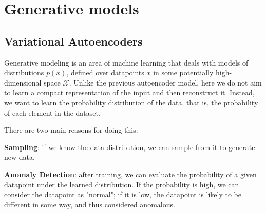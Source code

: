 \chapter{Generative models}

\section{Variational Autoencoders}
Generative modeling is an area of machine learning that deals with models of distributions $p(x)$, defined over datapoints $x$ in some potentially high-dimensional space $\mathcal{X}$. 
Unlike the previous autoencoder model, here we do not aim to learn a compact representation of the input and then reconstruct it. Instead, we want to learn the probability distribution of the data, that is, the probability of each element in the dataset.

There are two main reasons for doing this:
\begin{compactitemize}
    \item \textbf{Sampling}: if we know the data distribution, we can sample from it to generate new data.
    \item \textbf{Anomaly Detection}: after training, we can evaluate the probability of a given datapoint under the learned distribution. If the probability is high, we can consider the datapoint as "normal"; if it is low, the datapoint is likely to be different in some way, and thus considered anomalous.
\end{compactitemize}

